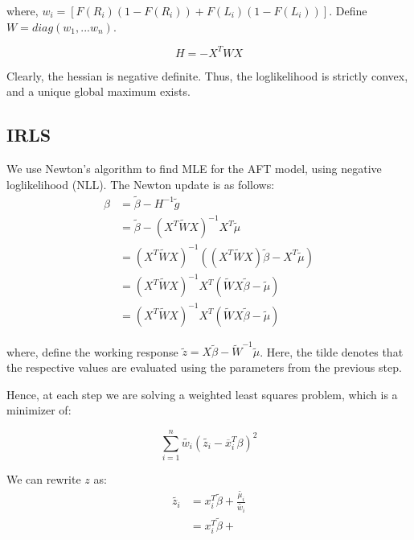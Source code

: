 \documentclass[12pt,a4paper]{report}
\begin{document}
where, $w_i = [F(R_i) (1-F(R_i)) + F(L_i) (1-F(L_i))]$. Define $W=diag(w_1, ... w_n)$.

\begin{equation}
H = - X^T W X
\end{equation}

Clearly, the hessian is negative definite. Thus, the loglikelihood is strictly convex, and a unique global
maximum exists.

\subsection{IRLS}
We use Newton's algorithm to find MLE for the AFT model, using negative loglikelihood (NLL). The Newton update is as follows:
\begin{equation}
\begin{split}
\beta & = \widetilde{\beta} - H^{-1}\widetilde{g} \\ 
 	  & = \widetilde{\beta} - (X^T \widetilde{W} X)^{-1} X^T \widetilde{\mu} \\
 	  & = (X^T \widetilde{W} X)^{-1} ((X^T \widetilde{W} X) \widetilde{\beta} -  X^T \widetilde{\mu} ) \\
 	  & = (X^T \widetilde{W} X)^{-1} X^T (\widetilde{W} X \widetilde{\beta} -  \widetilde{\mu} ) \\
 	  & = (X^T \widetilde{W} X)^{-1} X^T (\widetilde{W} X \widetilde{\beta} -  \widetilde{\mu} )
\end{split}
\end{equation}

where, define the working response $\widetilde{z} = X \widetilde{\beta} - \widetilde{W}^{-1} \widetilde{\mu}$.
Here, the tilde denotes that the respective values are evaluated using the parameters from the previous step.

Hence, at each step we are solving a weighted least squares problem, which is a minimizer of:

\begin{equation}
\sum_{i=1}^n \widetilde{w_i} (\widetilde{z_i} - \overline x_i^T \beta)^2
\end{equation}

We can rewrite $z$ as:
\begin{equation}
\begin{split}
\widetilde{ z_i} & = x_i^T \widetilde{ \beta} + \frac{ \widetilde{ \mu_i}} {\widetilde{ w_i}} \\
				 & = x_i^T \widetilde{ \beta} +
\end{split}
\end{equation}
\end{document}
